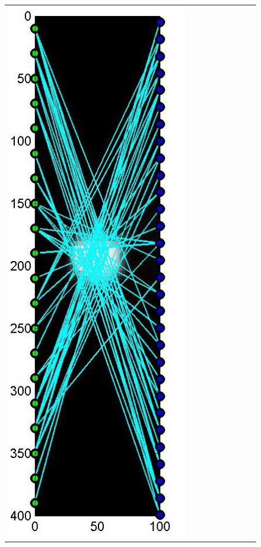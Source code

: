 \documentclass[11pt]{article}
\begin{document}
\begin{figure}[!h]
\begin{center}
\begin{tabular}{|c|c|c|c|c|c|c|c|c|}
			\includegraphics[width=.9\iwidth]{figures/newFigs/noisy/resultsExp-4-designs}
			&

\end{tabular}
\end{center}
\end{figure}
\end{document}
